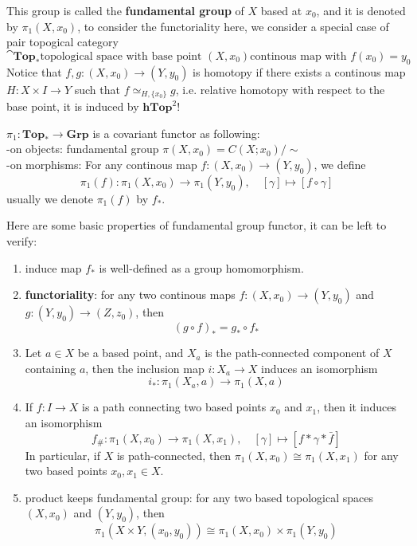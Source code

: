 This group is called the \textbf{fundamental group} of \(X\) based at \(x_0\), and it is denoted by \(\pi_1(X,x_0)\), to consider the functoriality here, we consider a special case of pair topogical category
\[\cat{\mathbf{Top}_*}{\text{topological space with base point }(X,x_0)}{\text{continous map with } f(x_0) = y_0}\]
Notice that \(f,g:(X,x_0) \to (Y,y_0)\) is homotopy if there exists a continous map \(H:X \times I \to Y\) such that \(f \simeq_{H,\{x_0\}} g\), i.e. relative homotopy with respect to the base point, it is induced by \(\mathbf{hTop}^2\)!
\begin{definition}
    \(\pi_1: \mathbf{Top}_* \to \mathbf{Grp}\) is a covariant functor as following:\\

    -on objects: fundamental group \(\pi(X,x_0) = C(X;x_0)/\sim \)\\

    -on morphisms: For any continous map \(f:(X,x_0) \to (Y,y_0)\), we define
    \[\pi_1(f): \pi_1(X,x_0) \to \pi_1(Y,y_0), \quad [\gamma] \mapsto [f \circ \gamma]\]
    usually we denote \(\pi_1(f)\) by \(f_*\).
\end{definition}

Here are some basic properties of fundamental group functor, it can be left to verify:
\begin{enumerate}
    \item induce map \(f_*\) is well-defined as a group homomorphism.
    \item \textbf{functoriality}: for any two continous maps \(f:(X,x_0) \to (Y,y_0)\) and \(g:(Y,y_0) \to (Z,z_0)\), then
    \[(g \circ f)_* = g_* \circ f_*\]
    \item Let \(a \in X\) be a based point, and \(X_a\) is the path-connected component of \(X\) containing \(a\), then the inclusion map \(i:X_a \to X\) induces an isomorphism
    \[i_*: \pi_1(X_a,a) \to \pi_1(X,a)\]
    \item If \(f:I \to X\) is a path connecting two based points \(x_0\) and \(x_1\), then it induces an isomorphism
    \[f_{\#}:\pi_1(X,x_0) \to \pi_1(X,x_1), \quad [\gamma] \mapsto [f * \gamma * \bar{f}]\]
    In particular, if \(X\) is path-connected, then \(\pi_1(X,x_0) \cong \pi_1(X,x_1)\) for any two based points \(x_0,x_1 \in X\).
    \item product keeps fundamental group: for any two based topological spaces \((X,x_0)\) and \((Y,y_0)\), then
    \[\pi_1(X \times Y, (x_0,y_0)) \cong \pi_1(X,x_0) \times \pi_1(Y,y_0)\]
\end{enumerate}

